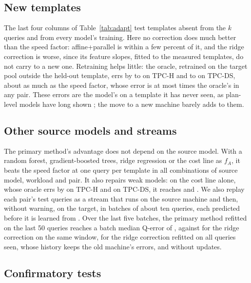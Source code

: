\documentclass[sigconf,review]{acmart}
\begin{document}
\subsection{New templates}
\label{sec:unseen}

The last four columns of Table~\ref{tab:adapt} test templates absent from
the $k$ queries and from every model's training. Here no correction does
much better than the speed factor: affine+parallel is within a few percent
of it, and the ridge correction is worse, since its feature slopes, fitted
to the measured templates, do not carry to a new one. Retraining helps
little: the oracle, retrained on the target pool outside the held-out
template, errs by \PARTpchHardRandomOracleMin{} to
\PARTpchHardRandomOracleMax{} on TPC-H and \PARTpcdsHardRandomOracleMin{}
to \PARTpcdsHardRandomOracleMax{} on TPC-DS, about as much as the speed
factor, whose error is at most \PHHFourMaxAll{} times the oracle's in any
pair. These errors are the model's on a template it has never seen, as
plan-level models have long shown \cite{akdere2012}; the move to a new
machine barely adds to them.

\subsection{Other source models and streams}
\label{sec:sources}

The primary method's advantage does not depend on the source model. With
a random forest, gradient-boosted trees, ridge regression or the cost line
as $f_A$, it beats the speed factor at one query per template in all
\SrcWinsTotal{} combinations of source model, workload and pair. It also
repairs weak models: on the cost line alone, whose oracle errs by
\SrcTpchCostOracle{} on TPC-H and \SrcTpcdsCostOracle{} on TPC-DS, it
reaches \SrcTpchCostPrimary{} and \SrcTpcdsCostPrimary. We also replay
each pair's test queries as a stream that runs on the source machine and
then, without warning, on the target, in batches of about ten queries,
each predicted before it is learned from \cite{gama2013}. Over the last
five batches, the primary method refitted on the last 50 queries reaches a
batch median Q-error of \StreamFinalLowdimTemplateLastFiveZero{}, against
\StreamFinalRidgeLastFiveZero{} for the ridge correction on the same
window, \StreamFinalRidgeAll{} for the ridge correction refitted on all
queries seen, whose history keeps the old machine's errors, and
\StreamFinalNever{} without updates.

\subsection{Confirmatory tests}
\label{sec:confirm}
\end{document}
